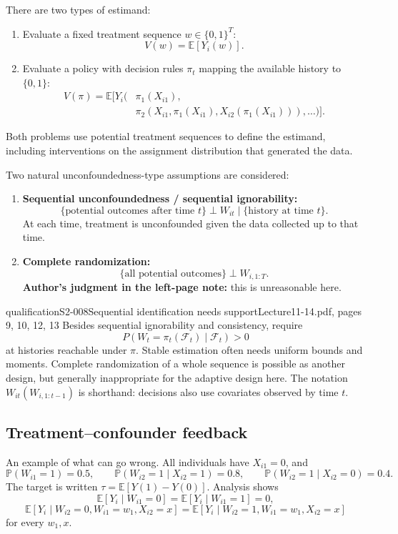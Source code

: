 There are two types of estimand:
\begin{enumerate}
 \item Evaluate a fixed treatment sequence $w\in\{0,1\}^T$:
 \[V(w)=\mathbb E[Y_i(w)].\]
 \item Evaluate a policy with decision rules $\pi_t$ mapping the available history to $\{0,1\}$:
 \begin{align*}
 V(\pi)=\mathbb E\bigl[Y_i\bigl(&\pi_1(X_{i1}),\\
 &\pi_2(X_{i1},\pi_1(X_{i1}),X_{i2}(\pi_1(X_{i1}))),\ldots\bigr)\bigr].\tag{12.2}
 \end{align*}
\end{enumerate}
 Both problems use potential treatment sequences to define the estimand, including interventions on the assignment distribution that generated the data.

Two natural unconfoundedness-type assumptions are considered:
\begin{enumerate}
 \item \textbf{Sequential unconfoundedness / sequential ignorability:}
 \[
 \{\text{potential outcomes after time }t\}\perp W_{it}
 \mid\{\text{history at time }t\}.
 \]
 At each time, treatment is unconfounded given the data collected up to that time.
 \item \textbf{Complete randomization:}
 \[\{\text{all potential outcomes}\}\perp W_{i,1:T}.\]
 \textbf{Author's judgment in the left-page note:} this is unreasonable here.
\end{enumerate}

\begin{reviewnote}{qualification}{S2-008}{Sequential identification needs support}{Lecture11-14.pdf, pages 9, 10, 12, 13}
Besides sequential ignorability and consistency, require
\[
 P(W_t=\pi_t(\mathcal F_t)\mid\mathcal F_t)>0
\]
at histories reachable under $\pi$. Stable estimation often needs uniform bounds and moments. Complete randomization of a whole sequence is possible as another design, but generally inappropriate for the adaptive design here. The notation $W_{it}(W_{i,1:t-1})$ is shorthand: decisions also use covariates observed by time $t$.
\end{reviewnote}


\subsection{Treatment--confounder feedback}
An example of what can go wrong. All individuals have $X_{i1}=0$, and
\[
 \mathbb P(W_{i1}=1)=0.5,\qquad
 \mathbb P(W_{i2}=1\mid X_{i2}=1)=0.8,\qquad
 \mathbb P(W_{i2}=1\mid X_{i2}=0)=0.4.
\]
The target is written $\tau=\mathbb E[Y(1)-Y(0)]$. Analysis shows
\[
 \mathbb E[Y_i\mid W_{i1}=0]=\mathbb E[Y_i\mid W_{i1}=1]=0,
\]
\[
 \mathbb E[Y_i\mid W_{i2}=0,W_{i1}=w_1,X_{i2}=x]
 =\mathbb E[Y_i\mid W_{i2}=1,W_{i1}=w_1,X_{i2}=x]
\]
for every $w_1,x$.

